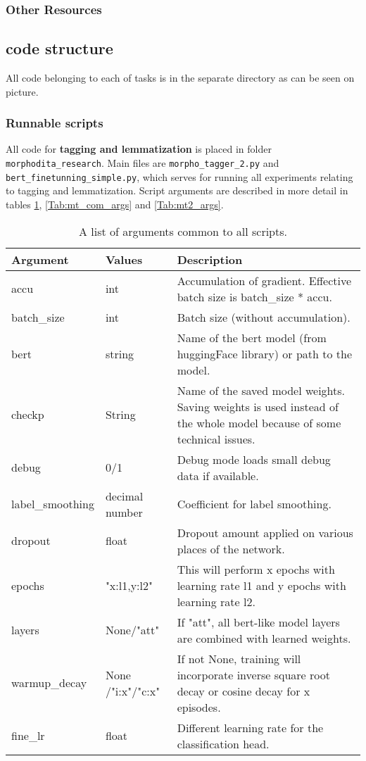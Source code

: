 \subsubsection{Other Resources}

\subsection{code structure}
All code belonging to each of tasks is in the separate directory as can be seen on picture. %
\subsubsection{Runnable scripts}
All code for \textbf{tagging and lemmatization} is placed in folder \texttt{morphodita\_research}. Main files are \texttt{morpho\_tagger\_2.py} and \texttt{bert\_finetunning\_simple.py}, which serves for running all experiments relating to tagging and lemmatization. Script arguments are described in more detail in tables \ref{Tab:com_args}, \ref{Tab:mt_com_args} and \ref{Tab:mt2_args}.

\begin{table}
\centering
\label{Tab:com_args}
\begin{tabular}{ |p{3cm}|p{}|p{6cm}| } 
 \hline
 Argument & Values & Description \\ 
 \hline \hline
 accu & int & Accumulation of gradient. Effective batch size is batch\_size * accu.  \\\hline
batch\_size & int & Batch size (without accumulation). \\ \hline
bert & string & Name of the bert model (from huggingFace library) or path to the model.  \\ \hline
  checkp & String & Name of the saved model weights. Saving weights is used instead of the whole model because of some technical issues.  \\ \hline
  debug & 0/1 & Debug mode loads small debug data if available. \\ \hline
  label\_smoothing & decimal number & Coefficient for label smoothing. \\ \hline
  dropout & float &  Dropout amount applied on various places of the network.  \\ \hline
 epochs & "x:l1,y:l2"  & This will perform x epochs with learning rate l1 and y epochs with learning rate l2.   \\ \hline
 layers & None/"att" & If "att", all bert-like model layers are combined with learned weights.  \\ \hline
 warmup\_decay & None /"i:x"/"c:x" & If not None, training will incorporate inverse square root decay or cosine decay for x episodes.  \\ \hline
 fine\_lr & float & Different learning rate for the classification head.  \\ \hline
 \hline
\end{tabular}
\caption{A list of arguments common to all scripts.} 
\end{table}


